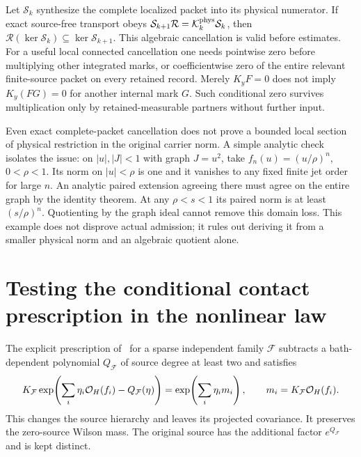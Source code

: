 \documentclass[11pt,letterpaper]{article}
\theoremstyle{plain}
\theoremstyle{remark}\newtheorem{remark}[theorem]{Scope}
\providecommand{\mathscr}{\mathcal}
\begin{document}
Let $\mathscr S_k$ synthesize the complete localized packet into its physical
numerator. If exact source-free transport obeys
$\mathscr S_{k+1}\mathscr R=\mathcal K_k^{\rm phys}\mathscr S_k$, then
$\mathscr R(\ker\mathscr S_k)\subseteq\ker\mathscr S_{k+1}$.
This algebraic cancellation is valid before estimates. For a useful local
connected cancellation one needs pointwise zero before multiplying other
integrated marks, or coefficientwise zero of the entire relevant finite-source
packet on every retained record. Merely $K_yF=0$ does not imply
$K_y(FG)=0$ for another internal mark $G$. Such conditional zero survives
multiplication only by retained-measurable partners without further input.

Even exact complete-packet cancellation does not prove a bounded local
section of physical restriction in the original carrier norm. A simple
analytic check isolates the issue: on $|u|,|J|<1$ with graph $J=u^2$, take
$f_n(u)=(u/\rho)^n$, $0<\rho<1$. Its norm on $|u|<\rho$ is one and it
vanishes to any fixed finite jet order for large $n$. An analytic paired
extension agreeing there must agree on the entire graph by the identity
theorem. At any $\rho<s<1$ its paired norm is at least $(s/\rho)^n$.
Quotienting by the graph ideal cannot remove this domain loss. This example
does not disprove actual admission; it rules out deriving it from a smaller
physical norm and an algebraic quotient alone.

\section{Testing the conditional contact prescription in the nonlinear law}
\label{sec:contact}

The explicit prescription of~\cite[\S3]{PW} for a sparse independent family
$\mathcal F$ subtracts a bath-dependent polynomial $Q_{\mathcal F}$ of
source degree at least two and satisfies
\begin{equation}
K_{\mathcal F}\exp\!\left(\sum_i\eta_i\mathcal O_H(f_i)
-Q_{\mathcal F}(\eta)\right)
=\exp\!\left(\sum_i\eta_i m_i\right),
\qquad m_i=K_{\mathcal F}\mathcal O_H(f_i).
\label{eq:conditionalprescription}
\end{equation}
This changes the source hierarchy and leaves its projected covariance.
It preserves the zero-source Wilson mass. The original source has the
additional factor $e^{Q_{\mathcal F}}$ and is kept distinct.
\end{document}
